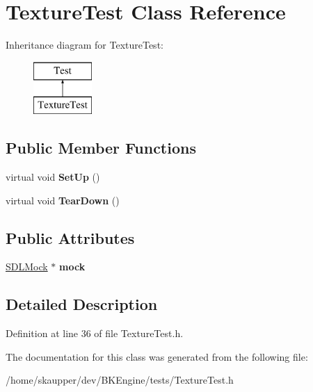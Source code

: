 \hypertarget{classTextureTest}{}\section{Texture\+Test Class Reference}
\label{classTextureTest}
Inheritance diagram for Texture\+Test\+:\begin{figure}[H]
\begin{center}
\leavevmode
\includegraphics[height=2.000000cm]{classTextureTest}
\end{center}
\end{figure}
\subsection*{Public Member Functions}
\begin{DoxyCompactItemize}
\item 
\mbox{\label{classTextureTest_a8cca7d9a0760cb391be5d9e6fb51f486}} 
virtual void {\bfseries Set\+Up} ()
\item 
\mbox{\label{classTextureTest_aaa60dee1e4561c37c49dd4736783e120}} 
virtual void {\bfseries Tear\+Down} ()
\end{DoxyCompactItemize}
\subsection*{Public Attributes}
\begin{DoxyCompactItemize}
\item 
\mbox{\label{classTextureTest_a1b0d48fea35d6bdadae4e1856cf12e21}} 
\hyperlink{classSDLMock}{S\+D\+L\+Mock} $\ast$ {\bfseries mock}
\end{DoxyCompactItemize}


\subsection{Detailed Description}


Definition at line 36 of file Texture\+Test.\+h.



The documentation for this class was generated from the following file\+:\begin{DoxyCompactItemize}
\item 
/home/skaupper/dev/\+B\+K\+Engine/tests/Texture\+Test.\+h\end{DoxyCompactItemize}
